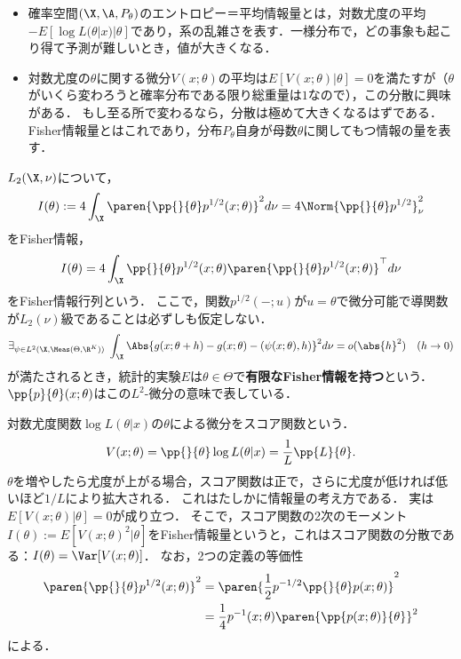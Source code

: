 \documentclass[uplatex,dvipdfmx]{jsreport}
\begin{document}
\begin{tcolorbox}[colframe=ForestGreen, colback=ForestGreen!10!white,breakable,colbacktitle=ForestGreen!40!white,coltitle=black,fonttitle=\bfseries\sffamily,
title=]
    \begin{itemize}
        \item 確率空間$(\X,\A,P_\theta)$のエントロピー＝平均情報量とは，対数尤度の平均$-E[\log L(\theta|x)|\theta]$であり，系の乱雑さを表す．一様分布で，どの事象も起こり得て予測が難しいとき，値が大きくなる．
        \item 対数尤度の$\theta$に関する微分$V(x;\theta)$の平均は$E[V(x;\theta)|\theta]=0$を満たすが（$\theta$がいくら変わろうと確率分布である限り総重量は$1$なので），この分散に興味がある．
        もし至る所で変わるなら，分散は極めて大きくなるはずである．
        Fisher情報量とはこれであり，分布$P_\theta$自身が母数$\theta$に関してもつ情報の量を表す．
    \end{itemize}
\end{tcolorbox}

\begin{definition}
    $L_2(\X,\nu)$について，
    \[I(\theta):=4\int_\X\paren{\pp{}{\theta}p^{1/2}(x;\theta)}^2d\nu=4\Norm{\pp{}{\theta}p^{1/2}}_\nu^2\]
    をFisher情報，
    \[I(\theta)=4\int_\X\pp{}{\theta}p^{1/2}(x;\theta)\paren{\pp{}{\theta}p^{1/2}(x;\theta)}^\top d\nu\]
    をFisher情報行列という．
    ここで，関数$p^{1/2}(-;u)$が$u=\theta$で微分可能で導関数が$L_2(\nu)$級であることは必ずしも仮定しない．
    \[\exists_{\psi\in L^2(\X,\Meas(\Theta,\R^K))}\;\int_\X\Abs{g(x;\theta+h)-g(x;\theta)-(\psi(x;\theta),h)}^2d\nu=o(\abs{h}^2)\quad(h\to0)\]
    が満たされるとき，統計的実験$E$は$\theta\in\Theta$で\textbf{有限なFisher情報を持つ}という．
    $\pp{p}{\theta}(x;\theta)$はこの$L^2$-微分の意味で表している．
\end{definition}
\begin{remarks}
    対数尤度関数$\log L(\theta|x)$の$\theta$による微分をスコア関数という．
    \[V(x;\theta)=\pp{}{\theta}\log L(\theta|x)=\frac{1}{L}\pp{L}{\theta}.\]
    $\theta$を増やしたら尤度が上がる場合，スコア関数は正で，さらに尤度が低ければ低いほど$1/L$により拡大される．
    これはたしかに情報量の考え方である．
    実は$E[V(x;\theta)|\theta]=0$が成り立つ．
    そこで，スコア関数の2次のモーメント$I(\theta):=E[V(x;\theta)^2|\theta]$をFisher情報量というと，これはスコア関数の分散である：$I(\theta)=\Var[V(x;\theta)]$．
    なお，2つの定義の等価性
    \begin{align*}
        \paren{\pp{}{\theta}p^{1/2}(x;\theta)}^{2}&=\paren{\frac{1}{2}p^{-1/2}\pp{}{\theta}p(x;\theta)}^2\\
        &=\frac{1}{4}p^{-1}(x;\theta)\paren{\pp{p(x;\theta)}{\theta}}^2
    \end{align*}
    による．
\end{remarks}
\end{document}
